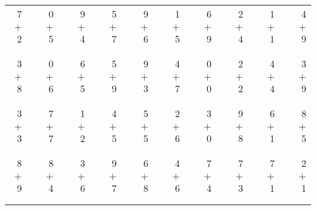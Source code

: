 \documentclass[12pt, letterpaper]{article}
\begin{document}
\begin{tabular}{rrrrrrrrrrrrrrrrrrr}
7 & & 0 & & 9 & & 5 & & 9 & & 1 & & 6 & & 2 & & 1 & & 4\\
$+$ 2 & & $+$ 5 & & $+$ 4 & & $+$ 7 & & $+$ 6 & & $+$ 5 & & $+$ 9 & & $+$ 4 & & $+$ 1 & & $+$ 9\\
\cline{1-1} \cline{3-3} \cline{5-5} \cline{7-7} \cline{9-9} \cline{11-11} \cline{13-13} \cline{15-15} \cline{17-17} \cline{19-19} \\ \\
3 & & 0 & & 6 & & 5 & & 9 & & 4 & & 0 & & 2 & & 4 & & 3\\
$+$ 8 & & $+$ 6 & & $+$ 5 & & $+$ 9 & & $+$ 3 & & $+$ 7 & & $+$ 0 & & $+$ 2 & & $+$ 4 & & $+$ 9\\
\cline{1-1} \cline{3-3} \cline{5-5} \cline{7-7} \cline{9-9} \cline{11-11} \cline{13-13} \cline{15-15} \cline{17-17} \cline{19-19} \\ \\
3 & & 7 & & 1 & & 4 & & 5 & & 2 & & 3 & & 9 & & 6 & & 8\\
$+$ 3 & & $+$ 7 & & $+$ 2 & & $+$ 5 & & $+$ 5 & & $+$ 6 & & $+$ 0 & & $+$ 8 & & $+$ 1 & & $+$ 5\\
\cline{1-1} \cline{3-3} \cline{5-5} \cline{7-7} \cline{9-9} \cline{11-11} \cline{13-13} \cline{15-15} \cline{17-17} \cline{19-19} \\ \\
8 & & 8 & & 3 & & 9 & & 6 & & 4 & & 7 & & 7 & & 7 & & 2\\
$+$ 9 & & $+$ 4 & & $+$ 6 & & $+$ 7 & & $+$ 8 & & $+$ 6 & & $+$ 4 & & $+$ 3 & & $+$ 1 & & $+$ 1\\
\cline{1-1} \cline{3-3} \cline{5-5} \cline{7-7} \cline{9-9} \cline{11-11} \cline{13-13} \cline{15-15} \cline{17-17} \cline{19-19} \\ \\
\end{tabular}
\newpage
\end{document}
